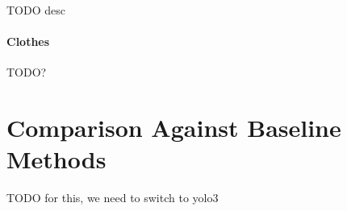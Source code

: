 TODO desc

\paragraph{Clothes}

TODO?

\section{Comparison Against Baseline Methods}

TODO for this, we need to switch to yolo3 






